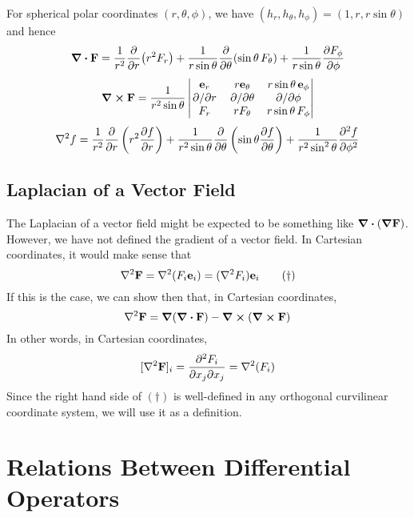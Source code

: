 \documentclass{article}
\begin{document}
For spherical polar coordinates $(r, \theta, \phi)$, we have $(h_r, h_\theta, h_\phi) = (1, r, r\sin\theta)$ and hence
\[ \div{\vb F} = \frac{1}{r^2} \pdv{r}(r^2 F_r) + \frac{1}{r\sin\theta} \pdv{\theta}(\sin \theta\, F_\theta) + \frac{1}{r\sin\theta} \pdv{F_\phi}{\phi} \]
\[ \curl{\vb F} = \frac{1}{r^2\sin\theta} \begin{vmatrix}
		\vb e_r  & r \vb e_\theta & r\sin\theta\, \vb e_\phi \\
		\pdv*{r} & \pdv*{\theta}  & \pdv*{\phi}              \\
		F_r      & r F_\theta     & r\sin\theta\, F_\phi
	\end{vmatrix} \]
\[ \laplacian{f} = \frac{1}{r^2} \pdv{r} \left( r^2 \pdv{f}{r} \right) + \frac{1}{r^2 \sin\theta} \pdv{\theta} \left( \sin \theta \pdv{f}{\theta} \right) + \frac{1}{r^2\sin^2 \theta} \pdv[2]{f}{\phi} \]

\subsection{Laplacian of a Vector Field}
The Laplacian of a vector field might be expected to be something like $\div(\grad {\vb F})$. However, we have not defined the gradient of a vector field. In Cartesian coordinates, it would make sense that
\begin{equation}
	\laplacian{\vb F} = \laplacian(F_i \vb e_i) = (\laplacian{F_i})\vb e_i
	\tag{$\dagger$}
\end{equation}
If this is the case, we can show then that, in Cartesian coordinates,
\[ \laplacian{\vb F} = \grad(\div{\vb F}) - \curl(\curl{\vb F}) \]
In other words, in Cartesian coordinates,
\[ [\laplacian{\vb F}]_i = \pdv{F_i}{x_j}{x_j} = \laplacian(F_i) \]
Since the right hand side of $(\dagger)$ is well-defined in any orthogonal curvilinear coordinate system, we will use it as a definition.

\section{Relations Between Differential Operators}
\end{document}
